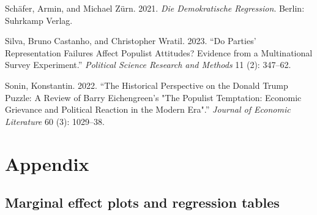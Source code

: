 \documentclass[
]{article}
\newlength{\cslhangindent}
\newlength{\cslentryspacingunit} %
\newenvironment{CSLReferences}[2] %
 {%
  \setlength{\parindent}{0pt}
  \ifodd #1
  \let\oldpar\par
  \def\par{\hangindent=\cslhangindent\oldpar}
  \fi
  \setlength{\parskip}{#2\cslentryspacingunit}
 }%
 {}
\begin{document}
\begin{CSLReferences}{1}{0}
\leavevmode{}%
Schäfer, Armin, and Michael Zürn. 2021. \emph{Die Demokratische
{Regression}}. Berlin: Suhrkamp Verlag.

\leavevmode{}%
Silva, Bruno Castanho, and Christopher Wratil. 2023. {``Do Parties'
Representation Failures Affect Populist Attitudes? {Evidence} from a
Multinational Survey Experiment.''} \emph{Political Science Research and
Methods} 11 (2): 347--62.

\leavevmode{}%
Sonin, Konstantin. 2022. {``The {Historical} {Perspective} on the
{Donald} {Trump} {Puzzle}: {A} {Review} of {Barry} {Eichengreen}'s
"{The} {Populist} {Temptation}: {Economic} {Grievance} and {Political}
{Reaction} in the {Modern} {Era}".''} \emph{Journal of Economic
Literature} 60 (3): 1029--38.

\end{CSLReferences}

\hypertarget{appendix}{%
\section{Appendix}\label{appendix}}

\hypertarget{marginal-effect-plots-and-regression-tables}{%
\subsection{Marginal effect plots and regression
tables}\label{marginal-effect-plots-and-regression-tables}}
\end{document}
